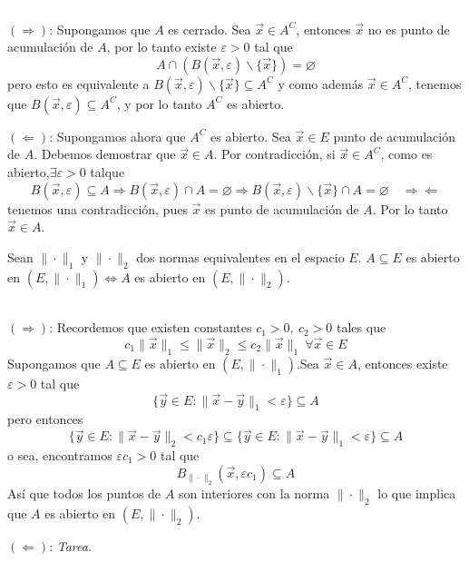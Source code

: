 \begin{demostracion}
\textcolor{white}{linea en blanco}
\\$({\Rightarrow})$: Supongamos que $A$ es
cerrado. Sea $\vec{x}\in A^C$, entonces $\vec{x}$ no es punto de acumulaci\'on
de $A$, por lo tanto existe $\varepsilon >0$ tal que
$$A\cap(B(\vec{x},\varepsilon)\backslash \{\vec{x}\})=\varnothing$$ pero esto es equivalente
a $B(\vec{x},\varepsilon)\backslash \{\vec{x}\}\subseteq A^C$ y como adem\'as $\vec{x}\in
A^C$, tenemos que $B(\vec{x},\varepsilon)\subseteq A^C$, y por lo tanto $A^C$
es abierto.

\smallskip

$(\Leftarrow)$: Supongamos ahora que $A^C$ es
abierto. Sea $\vec{x}\in E$ punto de acumulaci\'on de $A$. Debemos
demostrar que $\vec{x}\in A$. Por contradicci\'on, si $\vec{x}\in A^C$, como
es abierto,$\exists\varepsilon >0$ talque 
$$B(\vec{x},\varepsilon)\subseteq A
\Rightarrow B(\vec{x},\varepsilon)\cap A=\varnothing \Rightarrow B(\vec{x},\varepsilon)\backslash
\{\vec{x}\}\cap A=\varnothing \quad \Rightarrow\Leftarrow$$ tenemos una
contradicci\'on, pues $\vec{x}$ es punto de acumulaci\'on de $A$. Por lo
tanto $\vec{x}\in A$.
\end{demostracion}


\begin{teorema}Sean $\|\cdot \|_1$ y $\|\cdot \|_2$ dos normas equivalentes en el espacio $E$. $A\subseteq E$ es abierto en $(E,\|\cdot\|_1) \Leftrightarrow A$ es abierto en $(E,\|\cdot\|_2)$.
\end{teorema}

\begin{demostracion}\textcolor{white}{linea en blanco}
\\$(\Rightarrow)$: Recordemos que existen constantes $c_1>0,\:
c_2>0$ tales que
$$ c_1 \|\vec{x}\|_1 \leq \|\vec{x}\|_2 \leq c_2 \|\vec{x}\|_1 \: \forall \vec{x}\in E$$ 
Supongamos que $A\subseteq E$ es abierto
en $(E,\|\cdot\|_1)$.Sea $\vec{x}\in A$, entonces existe $\varepsilon >0$ tal
que 
$$\{\vec{y} \in E : \|\vec{x}-\vec{y}\|_1<\varepsilon\}\subseteq A$$ 
pero entonces
$$\{\vec{y} \in E : \|\vec{x}-\vec{y}\|_2<c_1\varepsilon\}\subseteq \{\vec{y} \in E
: \|\vec{x}-\vec{y}\|_1<\varepsilon\}\subseteq A$$ 
o sea, encontramos $\varepsilon c_1>0$
tal que 
$$B_{\|\cdot\|_2}(\vec{x},\varepsilon c_1)\subseteq A$$ 
As\'i que todos los puntos de $A$ son interiores con la norma
$\|\cdot\|_2$ lo que implica que $A$ es abierto en $(E,\|\cdot\|_2)$.

\smallskip

$(\Leftarrow)$: \emph{Tarea}.
\end{demostracion}


